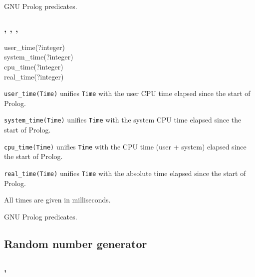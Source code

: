 \Portability

GNU Prolog predicates.

\subsubsection{,\label{user-time/1}
               ,
               ,
               }

\begin{TemplatesOneCol}
user\_time(?integer)\\
system\_time(?integer)\\
cpu\_time(?integer)\\
real\_time(?integer)

\end{TemplatesOneCol}

\Description

\texttt{user\_time(Time)} unifies \texttt{Time} with the user
CPU time elapsed since the start of Prolog.

\texttt{system\_time(Time)} unifies \texttt{Time} with the
system CPU time elapsed since the start of Prolog.

\texttt{cpu\_time(Time)} unifies \texttt{Time} with the CPU
time (user + system) elapsed since the start of Prolog.

\texttt{real\_time(Time)} unifies \texttt{Time} with the
absolute time elapsed since the start of Prolog.

All times are given in milliseconds.

\begin{PlErrors}


\end{PlErrors}

\Portability

GNU Prolog predicates.

\subsection{Random number generator}

\subsubsection{,
               }

